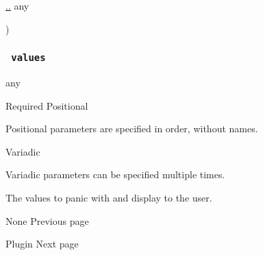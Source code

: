 { \hyperref[parameters-values]{..} { any } }

)

\subsubsection{\texorpdfstring{\texttt{\ values\ }}{ values }}\label{parameters-values}

{ any }

{Required} {{ Positional }}

\label{parameters-values-positional-tooltip}
Positional parameters are specified in order, without names.

{{ Variadic }}

\label{parameters-values-variadic-tooltip}
Variadic parameters can be specified multiple times.

The values to panic with and display to the user.

\href{/docs/reference/foundations/none/}{\pandocbounded{}}

{ None } { Previous page }

\href{/docs/reference/foundations/plugin/}{\pandocbounded{}}

{ Plugin } { Next page }
